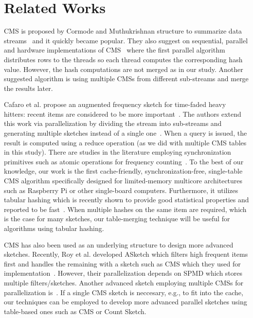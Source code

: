 \documentclass[10pt, conference, compsocconf]{IEEEtran}
\begin{document}
\section{Related Works}\label{sec:related}

CMS is proposed by Cormode and Muthukrishnan structure to summarize data streams~\cite{cormode2005} and it quickly became popular. They also suggest on sequential, parallel and hardware implementations of CMS~\cite{cormode2012} where the first parallel algorithm distributes rows to the threads so each thread computes the corresponding hash value. However, the hash computations are not merged as in our study. Another suggested algorithm is using multiple CMSs from different sub-streams and merge the results later.

Cafaro et al. propose an augmented frequency sketch for time-faded heavy hitters: recent items are considered to be more important~\cite{cafaro2016}. The authors extend this work via parallelization by dividing the stream into sub-streams and generating multiple sketches instead of a single one~\cite{cafaro2018}. When a query is issued, the result is computed using a reduce operation (as we did with multiple CMS tables in this study). There are studies in the literature employing synchronization primitives such as atomic operations for frequency counting~\cite{Das2009}. To the best of our knowledge, our work is the first cache-friendly, synchronization-free, single-table CMS algorithm specifically designed for limited-memory multicore architectures such as Raspberry Pi or other single-board computers. Furthermore, it utilizes tabular hashing which is recently shown to provide good statistical properties and reported to be fast~\cite{thorup2017,Dahlgaard2017}. When multiple hashes on the same item are required, which is the case for many sketches, our table-merging technique will be useful for algorithms using tabular hashing.

CMS has also been used as an underlying structure to design more advanced sketches. Recently, Roy et al. developed ASketch which filters high frequent items first and handles the remaining with a sketch such as CMS which they used for implementation~\cite{roy2016}. However, their parallelization depends on SPMD which stores multiple filters/sketches. Another advanced sketch employing multiple CMSs for parallelization is~\cite{Thomas2007}. If a single CMS sketch is neccesary, e.g., to fit into the cache, our techniques can be employed to develop more advanced parallel sketches using table-based ones such as CMS or Count Sketch.
\end{document}
